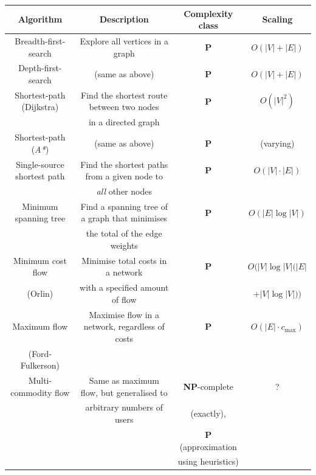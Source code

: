 \startnormtable
\begin{table}[!htbp]
	\begin{tabular}{|c|c|c|c|}
		\hline
  		\rowcolor{Dandelion} Algorithm & Description & Complexity class & Scaling \\
  		\hline
  		\hline
  		\rowcolor{LimeGreen} Breadth-first-search & Explore all vertices in a graph & \textbf{P} & $O(|V|+|E|)$ \\
  		\hline
  		\rowcolor{LimeGreen} Depth-first-search & (same as above) & \textbf{P} & $O(|V|+|E|)$ \\
		\hline
  		\rowcolor{LimeGreen} Shortest-path (Dijkstra) & Find the shortest route between two nodes & \textbf{P} & $O(|V|^2)$ \\
  		\rowcolor{LimeGreen} & in a directed graph & &  \\
  		  		\hline
		\rowcolor{LimeGreen} Shortest-path (\textit{A*}) & (same as above) & \textbf{P} & (varying) \\
  		  		\hline
		\rowcolor{LimeGreen} Single-source shortest path & Find the shortest paths from a given node to & \textbf{P} & $O(|V|\cdot |E|)$\\
  		\rowcolor{LimeGreen} & \textit{all} other nodes & & \\
 		\hline
		\rowcolor{LimeGreen} Minimum spanning tree & Find a spanning tree of a graph that minimises & \textbf{P} & $O(|E|\log |V|)$ \\
  		\rowcolor{LimeGreen} & the total of the edge weights & & \\
  		\hline
  		\rowcolor{LimeGreen} Minimum cost flow & Minimise total costs in a network &  \textbf{P} & $O(|V|\log |V|(|E|$\\
  		\rowcolor{LimeGreen} (Orlin) & with a specified amount of flow& & $+|V|\log |V|))$ \\
  		\hline
  		\rowcolor{LimeGreen} Maximum flow & Maximise flow in a network, regardless of costs & \textbf{P} & $O(|E|\cdot c_\mathrm{max})$ \\
  		\rowcolor{LimeGreen} (Ford-Fulkerson) & & & \\
  		\hline
  		\rowcolor{Lavender} Multi-commodity flow & Same as maximum flow, but generalised to & \textbf{NP}-complete & ? \\
  		\rowcolor{Lavender} & arbitrary numbers of users & (exactly), & \\
  		\rowcolor{Lavender} & & \textbf{P} (approximation & \\
  		\rowcolor{Lavender} & & using heuristics) & \\

\end{tabular}
\end{table}
